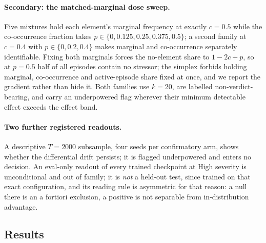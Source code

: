 \paragraph{Secondary: the matched-marginal dose sweep.} Five mixtures hold
each element's marginal frequency at exactly $c = 0.5$ while the
co-occurrence fraction takes $p \in \{0, 0.125, 0.25, 0.375, 0.5\}$; a
second family at $c = 0.4$ with $p \in \{0, 0.2, 0.4\}$ makes marginal and
co-occurrence separately identifiable. Fixing both marginals forces the
no-element share to $1 - 2c + p$, so at $p = 0.5$ half of all episodes
contain no stressor; the simplex forbids holding marginal, co-occurrence and
active-episode share fixed at once, and we report the gradient rather than
hide it. Both families use $k = 20$, are labelled non-verdict-bearing, and
carry an underpowered flag wherever their minimum detectable effect exceeds
the effect band.

\paragraph{Two further registered readouts.} A descriptive $T = 2000$
subsample, four seeds per confirmatory arm, shows whether the differential
drift persists; it is flagged underpowered and enters no decision. An
eval-only readout of every trained checkpoint at High severity is
unconditional and out of family; it is \emph{not} a held-out test, since
\JOINT{} trained on that exact configuration, and its reading rule is
asymmetric for that reason: a null there is an a fortiori exclusion, a
positive is not separable from in-distribution advantage.

\subsection{Results}
\label{sec:results}

